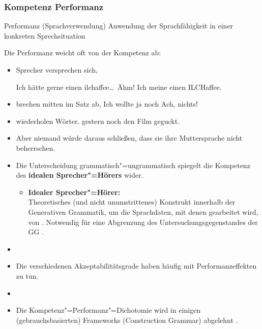 \begin{frame}
\frametitle{Kompetenz \vs Performanz}

\begin{block}{Performanz (Sprachverwendung)}
Anwendung der Sprachfähigkeit in einer konkreten Sprechsituation \citep[vgl.][]{Fries&MyP16d}	
\end{block}

\end{frame}


\begin{frame}

Die Performanz weicht oft von der Kompetenz ab: 
	\begin{itemize}
		\item Sprecher versprechen sich, 
		
\pause		
		\ea Ich hätte gerne einen ilchaffee\dots\ Ähm! Ich meine einen ILCHaffee.
		\z

\pause	
		\item brechen mitten im Satz ab,
\pause		
		\ea Ich wollte ja noch \alertred{\dots } Ach, nichts!
		\z

		\item wiederholen Wörter.
\pause		
		\ea {} gestern noch den Film geguckt.
		\z

		\item[]	Aber niemand würde daraus schließen, dass sie ihre Muttersprache nicht beherrschen.
	\end{itemize}

\end{frame}


\begin{frame}

\begin{itemize}

	\item Die Unterscheidung grammatisch"=ungrammatisch spiegelt die Kompetenz des \textbf{idealen Sprecher"=Hörers} wider.
	\begin{itemize}
		\item [\ras] \textbf{Idealer Sprecher"=Hörer:}\\
			Theoretisches (und nicht unumstrittenes) Konstrukt innerhalb der Generativen Grammatik, um die Sprachdaten, mit denen gearbeitet wird, von . Notwendig für eine Abgrenzung des Untersuchungsgegenstandes der GG \citep[vgl.][]{Fries16b}.
	\end{itemize}
\item []
	\item Die verschiedenen Akzeptabilitätsgrade haben häufig mit Performanzeffekten zu tun.
	\item []
	\item Die Kompetenz"=Performanz"=Dichotomie wird in einigen (gebrauchsbasierten) Frameworks (\zB Construction Grammar) abgelehnt \citep[vgl.][]{MuellerS15b, Nolda&Co14a}. 
\end{itemize}

\end{frame}


